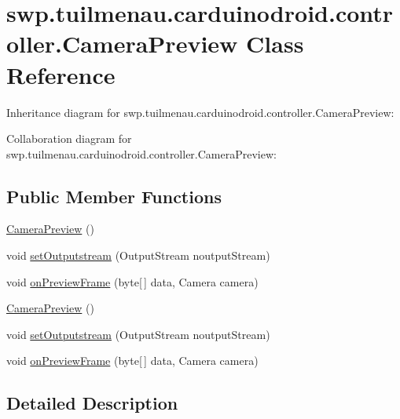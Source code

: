 \hypertarget{classswp_1_1tuilmenau_1_1carduinodroid_1_1controller_1_1_camera_preview}{}\section{swp.\+tuilmenau.\+carduinodroid.\+controller.\+Camera\+Preview Class Reference}
\label{classswp_1_1tuilmenau_1_1carduinodroid_1_1controller_1_1_camera_preview}


Inheritance diagram for swp.\+tuilmenau.\+carduinodroid.\+controller.\+Camera\+Preview\+:


Collaboration diagram for swp.\+tuilmenau.\+carduinodroid.\+controller.\+Camera\+Preview\+:
\subsection*{Public Member Functions}
\begin{DoxyCompactItemize}
\item 
\hyperlink{classswp_1_1tuilmenau_1_1carduinodroid_1_1controller_1_1_camera_preview_af01876b4b41133af38c837fa10d6d7da}{Camera\+Preview} ()
\item 
void \hyperlink{classswp_1_1tuilmenau_1_1carduinodroid_1_1controller_1_1_camera_preview_a81c06f156a2a06c1463bfdab54dbecfc}{set\+Outputstream} (Output\+Stream noutput\+Stream)
\item 
void \hyperlink{classswp_1_1tuilmenau_1_1carduinodroid_1_1controller_1_1_camera_preview_a171743b48835909ba936b1539e3f63d7}{on\+Preview\+Frame} (byte\mbox{[}$\,$\mbox{]} data, Camera camera)
\item 
\hyperlink{classswp_1_1tuilmenau_1_1carduinodroid_1_1controller_1_1_camera_preview_af01876b4b41133af38c837fa10d6d7da}{Camera\+Preview} ()
\item 
void \hyperlink{classswp_1_1tuilmenau_1_1carduinodroid_1_1controller_1_1_camera_preview_a81c06f156a2a06c1463bfdab54dbecfc}{set\+Outputstream} (Output\+Stream noutput\+Stream)
\item 
void \hyperlink{classswp_1_1tuilmenau_1_1carduinodroid_1_1controller_1_1_camera_preview_a171743b48835909ba936b1539e3f63d7}{on\+Preview\+Frame} (byte\mbox{[}$\,$\mbox{]} data, Camera camera)
\end{DoxyCompactItemize}


\subsection{Detailed Description}


